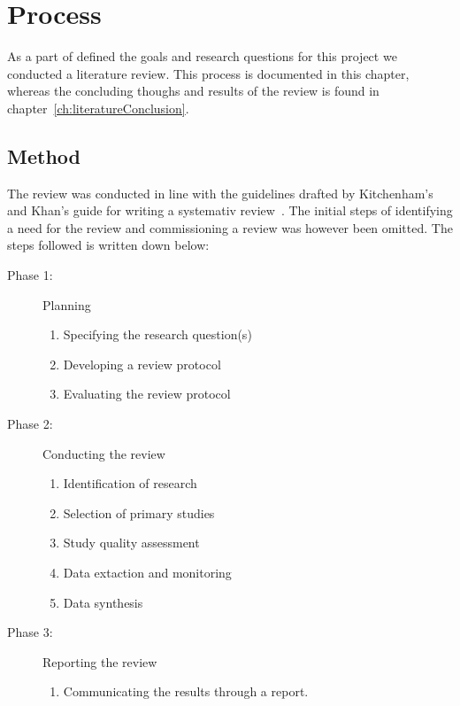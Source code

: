 \chapter{Process}\label{ch:literatureProcess}
As a part of defined the goals and research questions for this project we conducted a literature review. This process is documented in this chapter, whereas the concluding thoughs and results of the review is found in chapter~\ref{ch:literatureConclusion}. 

	
\section{Method}
The review was conducted in line with the guidelines drafted by Kitchenham's and Khan's guide for writing a systemativ review~\cite{kitchenham2007guidelines,khan2001undertaking}. 
The initial steps of identifying a need for the review and commissioning a review was however been omitted. The steps followed is written down below:
\begin{description}
	\item[Phase 1: ] Planning
		\begin{enumerate}
			\item Specifying the research question(s)
			\item Developing a review protocol
			\item Evaluating the review protocol
		\end{enumerate}
	\item[Phase 2: ] Conducting the review
		\begin{enumerate}
			\item Identification of research
			\item Selection of primary studies
			\item Study quality assessment
			\item Data extaction and monitoring
			\item Data synthesis
		\end{enumerate}
	\item[Phase 3: ] Reporting the review
		\begin{enumerate}
			\item Communicating the results through a report.
		\end{enumerate}
\end{description}

